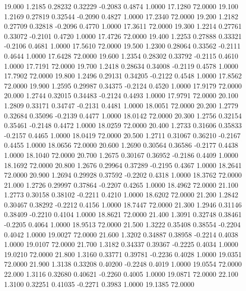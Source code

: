   19.000   1.2185   0.28232   0.32229  -0.2083   0.4874   1.0000  17.1280  72.0000
  19.100   1.2169   0.27819   0.32544  -0.2090   0.4827   1.0000  17.2340  72.0000
  19.200   1.2182   0.27709   0.32818  -0.2096   0.4770   1.0000  17.3611  72.0000
  19.300   1.2214   0.27761   0.33072  -0.2101   0.4720   1.0000  17.4726  72.0000
  19.400   1.2253   0.27888   0.33321  -0.2106   0.4681   1.0000  17.5610  72.0000
  19.500   1.2300   0.28064   0.33562  -0.2111   0.4644   1.0000  17.6428  72.0000
  19.600   1.2354   0.28302   0.33792  -0.2115   0.4610   1.0000  17.7191  72.0000
  19.700   1.2418   0.28634   0.34008  -0.2119   0.4578   1.0000  17.7902  72.0000
  19.800   1.2496   0.29131   0.34205  -0.2122   0.4548   1.0000  17.8562  72.0000
  19.900   1.2595   0.29987   0.34375  -0.2124   0.4520   1.0000  17.9179  72.0000
  20.000   1.2744   0.32015   0.34483  -0.2124   0.4493   1.0000  17.9791  72.0000
  20.100   1.2809   0.33171   0.34747  -0.2131   0.4481   1.0000  18.0051  72.0000
  20.200   1.2779   0.32684   0.35096  -0.2139   0.4477   1.0000  18.0142  72.0000
  20.300   1.2756   0.32154   0.35461  -0.2148   0.4472   1.0000  18.0259  72.0000
  20.400   1.2733   0.31606   0.35833  -0.2157   0.4465   1.0000  18.0419  72.0000
  20.500   1.2711   0.31067   0.36210  -0.2167   0.4455   1.0000  18.0656  72.0000
  20.600   1.2690   0.30564   0.36586  -0.2177   0.4438   1.0000  18.1040  72.0000
  20.700   1.2675   0.30167   0.36952  -0.2186   0.4409   1.0000  18.1692  72.0000
  20.800   1.2676   0.29964   0.37289  -0.2195   0.4367   1.0000  18.2641  72.0000
  20.900   1.2694   0.29928   0.37592  -0.2202   0.4318   1.0000  18.3762  72.0000
  21.000   1.2726   0.29997   0.37864  -0.2207   0.4265   1.0000  18.4962  72.0000
  21.100   1.2773   0.30158   0.38102  -0.2211   0.4210   1.0000  18.6202  72.0000
  21.200   1.2842   0.30467   0.38292  -0.2212   0.4156   1.0000  18.7447  72.0000
  21.300   1.2946   0.31146   0.38409  -0.2210   0.4104   1.0000  18.8621  72.0000
  21.400   1.3091   0.32748   0.38461  -0.2205   0.4064   1.0000  18.9513  72.0000
  21.500   1.3222   0.35408   0.38554  -0.2204   0.4042   1.0000  19.0027  72.0000
  21.600   1.3202   0.34887   0.38958  -0.2214   0.4038   1.0000  19.0107  72.0000
  21.700   1.3182   0.34337   0.39367  -0.2225   0.4034   1.0000  19.0210  72.0000
  21.800   1.3160   0.33771   0.39781  -0.2236   0.4028   1.0000  19.0351  72.0000
  21.900   1.3138   0.33208   0.40200  -0.2248   0.4019   1.0000  19.0554  72.0000
  22.000   1.3116   0.32680   0.40621  -0.2260   0.4005   1.0000  19.0871  72.0000
  22.100   1.3100   0.32251   0.41035  -0.2271   0.3983   1.0000  19.1385  72.0000
